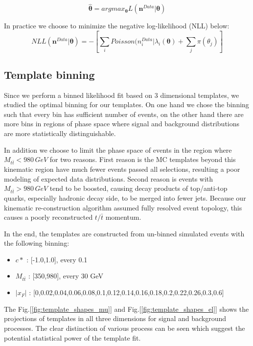 \begin{equation}
\bm{\hat{\theta}} = argmax_{\bm{\theta}}L(\bm{n}^{Data}|\bm{\theta})
\end{equation}

In practice we choose to minimize the negative log-likelihood (NLL) below:
\begin{equation}
NLL(\bm n^{Data}|\bm \theta) = - \left[ \sum_i Poisson(n_i^{Data}|\lambda_i(\bm{\theta}) + \sum_j \pi(\theta_j) \right]
\label{eq:NLL}
\end{equation}

\subsection{Template binning} 
Since we perform a binned likelihood fit based on 3 dimensional templates, we studied the optimal binning for our templates. On one hand we chose the binning such that every bin has sufficient number of events, on the other hand there are more bins in regions of phase space where signal and background distributions are more statistically distinguishable. 

In addition we choose to limit the phase space of events in the region where $M_{t\bar{t}} < 980 \, GeV$ for two reasons. First reason is the MC templates beyond this kinematic region have much fewer events passed all selections, resulting a poor modeling of expected data distributions. Second reason is events with $M_{t\bar{t}} > 980 \, GeV$ tend to be boosted, causing decay products of top/anti-top quarks, especially hadronic decay side, to be  merged into fewer jets. Because our kinematic re-construction algorithm assumed fully resolved event topology, this causes a poorly reconstructed $t/\bar{t}$ momentum. 

In the end, the templates are constructed from un-binned simulated events with the following binning:
\begin{itemize}
\item $c*$ : [-1.0,1.0], every 0.1
\item $M_{t\bar{t}}$ : [350,980], every 30 GeV
\item $|x_F|$ : [0,0.02,0.04,0.06,0.08,0.1,0.12,0.14,0.16,0.18,0.2,0.22,0.26,0.3,0.6]
\end{itemize}

The Fig.[\ref{fig:template_shapes_mu}] and Fig.[\ref{fig:template_shapes_el}] shows the projections of templates in all three dimensions for signal and background processes. The clear distinction of various process can be seen which suggest the potential statistical power of the template fit. 

